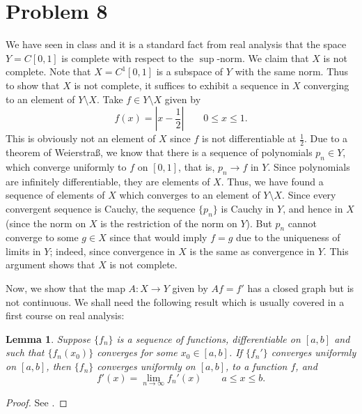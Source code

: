 \documentclass[10pt]{amsart}
\theoremstyle{thmstyle}
\newtheorem{lemma}[theorem]{Lemma}
\theoremstyle{defstyle}
\renewcommand{\le}{\leqslant}
\begin{document}
\section{Problem 8}

We have seen in class and it is a standard fact from real analysis that the space $Y = C[0, 1]$ is complete with respect to the $\sup$-norm. We claim that $X$ is not complete. Note that $X = C^1[0, 1]$ is a subspace of $Y$ with the same norm. Thus to show that $X$ is not complete, it suffices to exhibit a sequence in $X$ converging to an element of $Y\setminus X$. Take $f\in Y\setminus X$ given by 
\begin{equation*}
	f(x) = \left|x - \frac{1}{2}\right| \qquad 0\le x\le 1.
\end{equation*}
This is obviously not an element of $X$ since $f$ is not differentiable at $\frac{1}{2}$. Due to a theorem of Weierstra\ss, we know that there is a sequence of polynomials $p_n\in Y$, which converge uniformly to $f$ on $[0, 1]$, that is, $p_n\to f$ in $Y$. Since polynomials are infinitely differentiable, they are elements of $X$. Thus, we have found a sequence of elements of $X$ which converges to an element of $Y\setminus X$. Since every convergent sequence is Cauchy, the sequence $\{p_n\}$ is Cauchy in $Y$, and hence in $X$ (since the norm on $X$ is the restriction of the norm on $Y$). But $p_n$ cannot converge to some $g\in X$ since that would imply $f = g$ due to the uniqueness of limits in $Y$; indeed, since convergence in $X$ is the same as convergence in $Y$. This argument shows that $X$ is not complete.

Now, we show that the map $A : X\to Y$ given by $Af = f'$ has a closed graph but is not continuous. We shall need the following result which is usually covered in a first course on real analysis:
\begin{lemma}
	Suppose $\{f_n\}$ is a sequence of functions, differentiable on $[a, b]$ and such that $\{f_n(x_0)\}$ converges for some $x_0\in [a, b]$. If $\{f_n'\}$ converges uniformly on $[a, b]$, then $\{f_n\}$ converges uniformly on $[a, b]$, to a function $f$, and 
	\begin{equation*}
		f'(x) = \lim_{n\to\infty} f_n'(x)\qquad a\le x\le b.
	\end{equation*}
\end{lemma}
\begin{proof}
	See \cite[Theorem 7.17]{baby-rudin}.
\end{proof}
\end{document}
